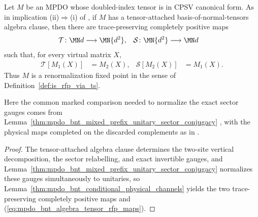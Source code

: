 \begin{lemma}
    \label{thm:mpdo_bnt_algebra_tensor_to_rfp}
    \leanok
    Let $M$ be an MPDO whose doubled-index tensor is in CPSV
    canonical form.  As in implication (ii)$\Rightarrow$(i) of
    \cite[Theorem~4.14, lines~972--993]{Cirac2016MPDO_arXiv}, if $M$ has a
    tensor-attached basis-of-normal-tensors algebra clause, then there are
    trace-preserving completely positive maps
    \begin{align}
        \mathcal T\colon\MN d    & \longrightarrow\MN{d^2},
                                 &
        \mathcal S\colon\MN{d^2} & \longrightarrow\MN d
        \notag
    \end{align}
    such that, for every virtual matrix $X$,
    \begin{align}
        \mathcal T[M_1(X)] & =M_2(X),
                           &
        \mathcal S[M_2(X)] & =M_1(X).
        \label{eq:mpdo_bnt_algebra_tensor_rfp_maps}
    \end{align}
    Thus $M$ is a renormalization fixed point in the sense of
    Definition~\ref{def:is_rfp_via_ts}.

    Here the common marked comparison needed to normalize the exact sector
    gauges comes from
    Lemma~\ref{thm:mpdo_bnt_mixed_prefix_unitary_sector_conjugacy}
    \cite{gap:cpsv16_two_site_sector_unitary_gauge_gap}, with the physical maps
    completed on the discarded complements as in
    \cite{gap:cpgsv17_vertical_isometry_zero_sector}.
\end{lemma}

\begin{proof}\leanok
    The tensor-attached algebra clause determines the two-site vertical
    decomposition, the sector relabelling, and exact invertible gauges, and
    Lemma~\ref{thm:mpdo_bnt_mixed_prefix_unitary_sector_conjugacy}
    normalizes these gauges simultaneously to unitaries, so
    Lemma~\ref{thm:mpdo_bnt_conditional_physical_channels} yields the two
    trace-preserving completely positive maps and
    (\ref{eq:mpdo_bnt_algebra_tensor_rfp_maps}).
\end{proof}
